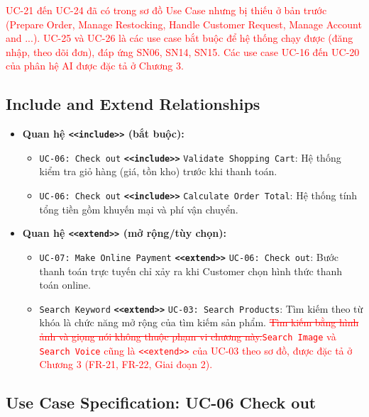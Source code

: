 \documentclass[12pt,a4paper,oneside]{report}
\newif\ifmark \marktrue
\newcommand{\chg}[1]{\ifmark\textcolor{red}{#1}\else #1\fi}
\newcommand{\del}[1]{\ifmark\textcolor{red}{\sout{#1}}\fi}
\begin{document}
\chg{UC-21 đến UC-24 đã có trong sơ đồ Use Case nhưng bị thiếu ở bản trước (Prepare Order, Manage Restocking, Handle Customer Request, Manage Account and ...). UC-25 và UC-26 là các use case bắt buộc để hệ thống chạy được (đăng nhập, theo dõi đơn), đáp ứng SN06, SN14, SN15. Các use case UC-16 đến UC-20 của phân hệ AI được đặc tả ở Chương 3.}

\subsection{Include and Extend Relationships}

\begin{itemize}
  \item \textbf{Quan hệ \texttt{<<include>>} (bắt buộc):}
  \begin{itemize}
    \item \texttt{UC-06: Check out} \textbf{\texttt{<<include>>}} \texttt{Validate Shopping Cart}: Hệ thống kiểm tra giỏ hàng (giá, tồn kho) trước khi thanh toán.
    \item \texttt{UC-06: Check out} \textbf{\texttt{<<include>>}} \texttt{Calculate Order Total}: Hệ thống tính tổng tiền gồm khuyến mại và phí vận chuyển.
  \end{itemize}
  \item \textbf{Quan hệ \texttt{<<extend>>} (mở rộng/tùy chọn):}
  \begin{itemize}
    \item \texttt{UC-07: Make Online Payment} \textbf{\texttt{<<extend>>}} \texttt{UC-06: Check out}: Bước thanh toán trực tuyến chỉ xảy ra khi Customer chọn hình thức thanh toán online.
    \item \texttt{Search Keyword} \textbf{\texttt{<<extend>>}} \texttt{UC-03: Search Products}: Tìm kiếm theo từ khóa là chức năng mở rộng của tìm kiếm sản phẩm. \del{Tìm kiếm bằng hình ảnh và giọng nói không thuộc phạm vi chương này.}\chg{\texttt{Search Image} và \texttt{Search Voice} cũng là \texttt{<<extend>>} của UC-03 theo sơ đồ, được đặc tả ở Chương 3 (FR-21, FR-22, Giai đoạn 2).}
  \end{itemize}
\end{itemize}


\subsection{Use Case Specification: UC-06 Check out}
\end{document}
